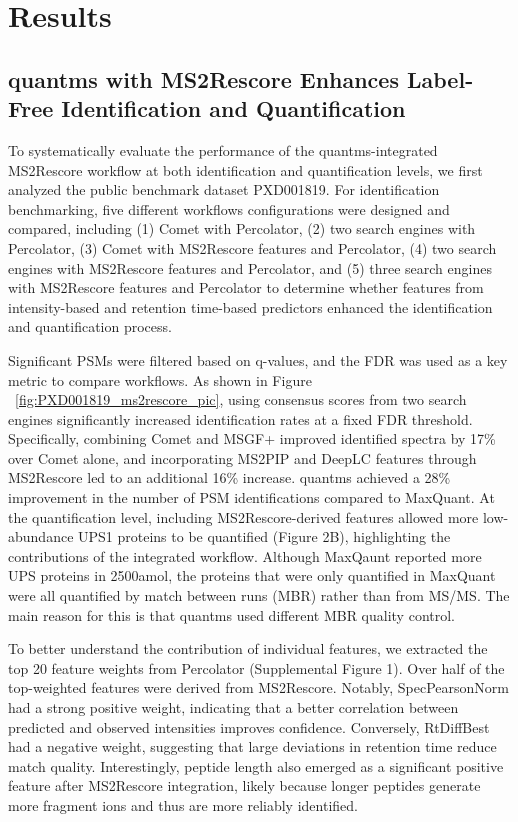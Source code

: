 \documentclass[12pt]{article}
\begin{document}
\section{Results}

\subsection{quantms with MS2Rescore Enhances Label-Free Identification and Quantification}
To systematically evaluate the performance of the quantms-integrated MS2Rescore workflow at both identification and quantification levels, we first analyzed the public benchmark dataset PXD001819. For identification benchmarking, five different workflows configurations were designed and compared, including (1) Comet with Percolator, (2) two search engines with Percolator, (3) Comet with MS2Rescore features and Percolator, (4) two search engines with MS2Rescore features and Percolator, and (5) three search engines with MS2Rescore features and Percolator to determine whether features from intensity-based and retention time-based predictors enhanced the identification and quantification process.

Significant PSMs were filtered based on q-values, and the FDR was used as a key metric to compare workflows. As shown in Figure ~\ref{fig:PXD001819_ms2rescore_pic}, using consensus scores from two search engines significantly increased identification rates at a fixed FDR threshold. Specifically, combining Comet and MSGF+ improved identified spectra by 17\% over Comet alone, and incorporating MS2PIP and DeepLC features through MS2Rescore led to an additional 16\% increase. quantms achieved a 28\% improvement in the number of PSM identifications compared to MaxQuant. At the quantification level, including MS2Rescore-derived features allowed more low-abundance UPS1 proteins to be quantified (Figure 2B), highlighting the contributions of the integrated workflow. Although MaxQaunt reported more UPS proteins in 2500amol, the proteins that were only quantified in MaxQuant were all quantified by match between runs (MBR) rather than from MS/MS. The main reason for this is that quantms used different MBR quality control.

To better understand the contribution of individual features, we extracted the top 20 feature weights from Percolator (Supplemental Figure 1). Over half of the top-weighted features were derived from MS2Rescore. Notably, SpecPearsonNorm had a strong positive weight, indicating that a better correlation between predicted and observed intensities improves confidence. Conversely, RtDiffBest had a negative weight, suggesting that large deviations in retention time reduce match quality. Interestingly, peptide length also emerged as a significant positive feature after MS2Rescore integration, likely because longer peptides generate more fragment ions and thus are more reliably identified.
\end{document}
